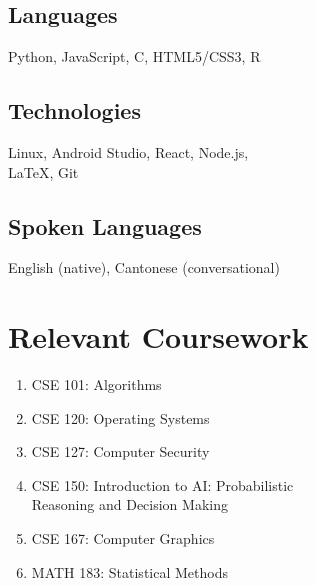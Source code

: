 \documentclass{article}
\begin{document}
\begin{paracol}{2}
\vspace{-0.5em}
\subsection{Languages} \hfill
	
	Python, JavaScript, C, HTML5/CSS3, R
	
\vspace{-0.5em}
\subsection{Technologies} \hfill

	Linux, Android Studio, React, Node.js, \\\indent LaTeX, Git
	
\vspace{-0.5em}
\subsection{Spoken Languages} \hfill

	English (native), Cantonese (conversational)
	
\section{Relevant Coursework}
\begin{enumerate}[leftmargin=0cm]
	\item[] CSE 101: Algorithms
	\item[] CSE 120: Operating Systems
	\item[] CSE 127: Computer Security
	\item[] CSE 150: Introduction to AI: Probabilistic\\Reasoning and Decision Making 
	\item[] CSE 167: Computer Graphics
	\item[] MATH 183: Statistical Methods
\end{enumerate}

\end{paracol}
\end{document}
